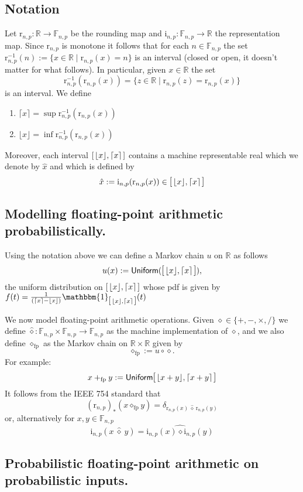 \documentclass[10pt,a4paper]{article}
\newcommand{\F}[1][n,p]{\mathbb{F}_{#1}}
\newcommand{\R}{\mathbb{R}}
\newcommand{\Rep}[1][n,p]{\mathrm{i}_{#1}}
\newcommand{\Round}[1][n,p]{\mathrm{r}_{#1}}
\newcommand{\one}{\mathbbm{1}}
\newcommand{\Unif}{\mathsf{Uniform}}
\newcommand{\ceil}[1]{\lceil #1 \rceil}
\newcommand{\floor}[1]{\lfloor #1 \rfloor}
\newcommand{\intvl}[1]{\mathlarger{\left[\right.}  #1 \mathlarger{\left.\right]}}
\newcommand{\inv}{^{-1}}
\newcommand{\fintvl}[1][x]{\intvl{\floor{#1},\ceil{#1}}}
\newcommand{\fp}{_{\mathrm{fp}}}
\begin{document}
\subsection*{Notation}
Let $\Round:\R\to\F$ be the rounding map and $\Rep: \F\to \R$ the representation map. Since $\Round$ is monotone it follows that for each $n\in\F$ the set $\Round\inv(n):=\{x\in\R\mid \Round(x)=n\}$ is an interval (closed or open, it doesn't matter for what follows). In particular, given $x\in \R$ the set
\[
\Round\inv(\Round(x))=\{z\in\R\mid \Round(z)=\Round(x)\}
\]
is an interval. We define
\begin{enumerate}
\item $\ceil{x}=\sup \Round\inv(\Round(x))$
\item $\floor{x}=\inf \Round\inv(\Round(x))$
\end{enumerate}
Moreover, each interval $\fintvl$ contains a machine representable real which we denote by $\hat{x}$ and which is defined by
\[
\hat{x}:=\Rep(\Round(x))\in \intvl{\floor{x},\ceil{x}}
\]

\subsection*{Modelling floating-point arithmetic probabilistically.}

Using the notation above we can define a Markov chain $u$ on $\R$ as follows
\[
u(x):=\Unif(\fintvl),
\]
the uniform distribution on $\fintvl$ whose pdf is given by $f(t)=\frac{1}{(\ceil{x}-\floor{x})}\one_{\fintvl}(t)$

We now model floating-point arithmetic operations. Given $\diamond\in \{+,-,\times,/\}$ we define $\widehat{\diamond}:\F\times \F\to \F$ as the machine implementation of $\diamond$, and we also define $\diamond\fp$ as the Markov chain on $\R\times \R$ given by
\[
\diamond\fp:=u\circ\diamond.
\]
For example:
\[
x+\fp y:=\Unif\fintvl[x+y]
\]
It follows from the IEEE 754 standard that
\[
(\Round)_\ast(x\diamond\fp y)=\delta_{\Round(x)~\widehat{\diamond}~\Round(y)}
\]
or, alternatively for $x,y\in\F$
\[
\Rep(x~\widehat{\diamond}~y)=\widehat{\Rep(x)\diamond \Rep(y)}
\]

\subsection*{Probabilistic floating-point arithmetic on probabilistic inputs.}
\end{document}
